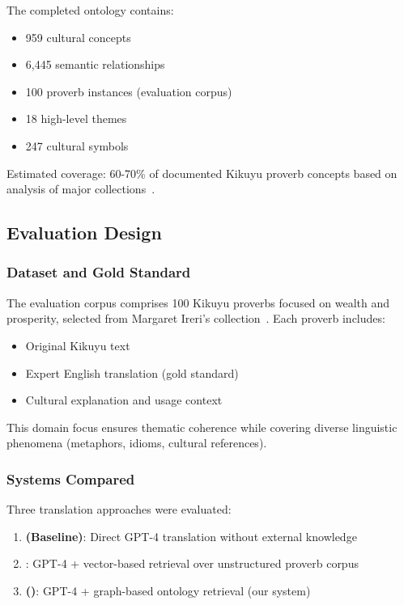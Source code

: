 The completed ontology contains:
\begin{itemize}
    \item 959 cultural concepts
    \item 6,445 semantic relationships
    \item 100 proverb instances (evaluation corpus)
    \item 18 high-level themes
    \item 247 cultural symbols
\end{itemize}

Estimated coverage: 60-70\% of documented Kikuyu proverb concepts based on analysis of major collections~\cite{barra1960kikuyu,ireri2019proverbs}.

\subsection{Evaluation Design}
\label{subsec:evaluation}

\subsubsection{Dataset and Gold Standard}

The evaluation corpus comprises 100 Kikuyu proverbs focused on wealth and prosperity, selected from Margaret Ireri's collection~\cite{ireri2019proverbs}. Each proverb includes:
\begin{itemize}
    \item Original Kikuyu text
    \item Expert English translation (gold standard)
    \item Cultural explanation and usage context
\end{itemize}

This domain focus ensures thematic coherence while covering diverse linguistic phenomena (metaphors, idioms, cultural references).

\subsubsection{Systems Compared}

Three translation approaches were evaluated:

\begin{enumerate}
    \item \textbf{\raw{} (Baseline)}: Direct GPT-4 translation without external knowledge
    \item \textbf{\trad{}}: GPT-4 + vector-based retrieval over unstructured proverb corpus
    \item \textbf{\ograg{} (\thillmo{})}: GPT-4 + graph-based ontology retrieval (our system)
\end{enumerate}

